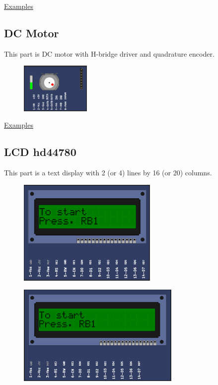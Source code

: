 \href{https://lcgamboa.github.io/picsimlab_examples/examples/examples_index.html\#Buzzer}{Examples}


\subsection{DC Motor}

This part is DC motor with H-bridge driver and quadrature encoder. 

\begin{figure}[H]
\center
\includegraphics[width=0.3\textwidth]{img/part_dcmotor.png} 
\end{figure} 

\href{https://lcgamboa.github.io/picsimlab_examples/examples/examples_index.html\#DC\_Motor}{Examples}


\subsection{LCD hd44780}

This part is a text display with 2 (or 4) lines by 16 (or 20) columns.

\begin{figure}[H]
\center
\includegraphics[width=0.6\textwidth]{img/part_hd44780_2x16.png} 
\end{figure} 

\begin{figure}[H]
\center
\includegraphics[width=0.7\textwidth]{img/part_hd44780_2x20.png} 
\end{figure} 

